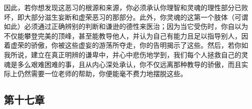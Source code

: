 \par

因此，若你想发现这恶习的根源和来源，你必须承认你理智和灵魂的理性部分已败坏，即大部分滋生妄断和虚荣恶习的那部分。此外，你灵魂的这第一个肢体（可谓如此）必须通过正确辨别的判断和谦逊的德性来医治；因为当它受伤时，你自以为不仅能攀登完美的顶峰，甚至能教导他人，并认为自己有能力且足以指导别人，因着虚荣的骄傲，你被这些虚妄的游荡所夺走，你的告明揭示了这些。然后，若你如我所说，建立在真正明辨的谦卑中，并心中悲伤地学到，我们每个人拯救自己的灵魂是多么艰难困难的事，且从内心深处承认，你不仅远离那种教导的骄傲，而且实际上仍然需要一位老师的帮助，你便能毫不费力地摆脱这些。\par


\subsection{第十七章}

\par

